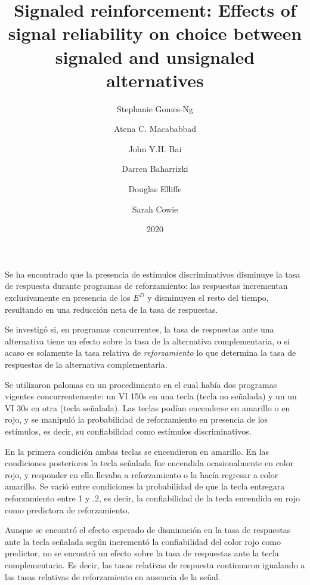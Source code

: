 \documentclass[a4paper,12pt]{article}
\title{Signaled reinforcement: Effects of signal reliability on choice between signaled and unsignaled alternatives}
\author{Stephanie Gomes-Ng \and Atena C. Macababbad \and John Y.H. Bai \and Darren Baharrizki \and Douglas Elliffe \and Sarah Cowie}
\date{2020}
\begin{document}
{\scshape\bfseries \maketitle}

Se ha encontrado que la presencia de estímulos discriminativos disminuye la tasa de respuesta durante programas de reforzamiento: las respuestas incrementan exclusivamente en presencia de los $E^{D}$ y disminuyen el resto del tiempo, resultando en una reducción neta de la tasa de respuestas.

Se investigó si, en programas concurrentes, la tasa de respuestas ante una alternativa tiene un efecto sobre la tasa de la alternativa complementaria, o si acaso es solamente la tasa relativa de {\itshape reforzamiento} lo que determina la tasa de respuestas de la alternativa complementaria.

Se utilizaron palomas en un procedimiento en el cual había dos programas vigentes concurrentemente: un VI 150s en una tecla (tecla no señalada) y un un VI 30s en otra (tecla señalada). Las teclas podían encenderse en amarillo o en rojo, y se manipuló la probabilidad de reforzamiento en presencia de los estímulos, es decir, su confiabilidad como estímulos discriminativos.

En la primera condición ambas teclas se encendieron en amarillo. En las condiciones posteriores la tecla señalada fue encendida ocasionalmente en color rojo, y responder en ella llevaba a reforzamiento o la hacía regresar a color amarillo. Se varió entre condiciones la probabilidad de que la tecla entregara reforzamiento entre 1 y .2, es decir, la confiabilidad de la tecla encendida en rojo como predictora de reforzamiento.

Aunque se encontró el efecto esperado de disminución en la tasa de respuestas ante la tecla señalada según incrementó la confiabilidad del color rojo como predictor, no se encontró un efecto sobre la tasa de respuestas ante la tecla complementaria. Es decir, las tasas relativas de respuesta continuaron igualando a las tasas relativas de reforzamiento en ausencia de la señal.
\end{document}
